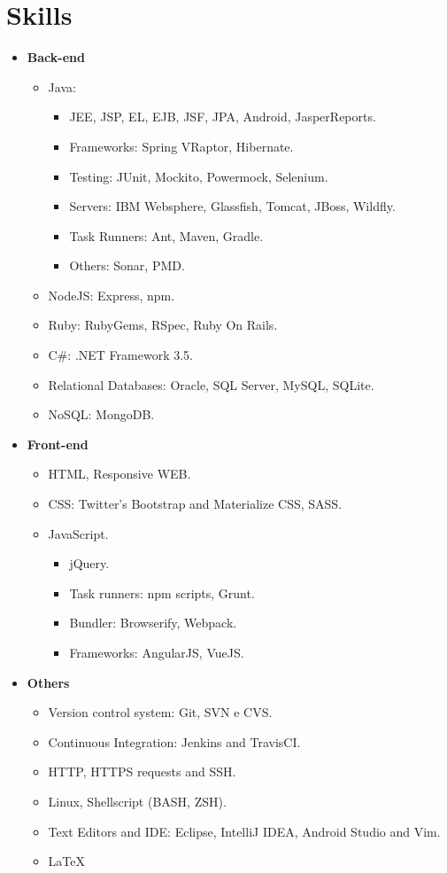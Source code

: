 \documentclass[12pt,a4paper]{moderncv}
\begin{document}
\section{Skills}
\begin{itemize}
\item \textbf{Back-end}
\begin{itemize}
    \item Java:
    \begin{itemize}
        \item JEE, JSP, EL, EJB, JSF, JPA, Android, JasperReports.
        \item Frameworks: Spring VRaptor, Hibernate.
        \item Testing: JUnit, Mockito, Powermock, Selenium.
        \item Servers: IBM Websphere, Glassfish, Tomcat, JBoss, Wildfly.
        \item Task Runners: Ant, Maven, Gradle.
        \item Others: Sonar, PMD.
    \end{itemize}
    \item NodeJS: Express, npm.
    \item Ruby: RubyGems, RSpec, Ruby On Rails.
    \item C\#: .NET Framework 3.5.
    \item Relational Databases: Oracle, SQL Server, MySQL, SQLite.
    \item NoSQL: MongoDB.
\end{itemize}
\item \textbf{Front-end}
\begin{itemize}
    \item HTML, Responsive WEB.
    \item CSS: Twitter's Bootstrap and Materialize CSS, SASS.
    \item JavaScript.
    \begin{itemize}
        \item jQuery.
        \item Task runners: npm scripts, Grunt.
        \item Bundler: Browserify, Webpack.
        \item Frameworks: AngularJS, VueJS.
    \end{itemize}
\end{itemize}
\item \textbf{Others}
\begin{itemize}
  \item Version control system: Git, SVN e CVS.
  \item Continuous Integration: Jenkins and TravisCI.
  \item HTTP, HTTPS requests and SSH.
  \item Linux, Shellscript (BASH, ZSH).
  \item Text Editors and IDE: Eclipse, IntelliJ IDEA, Android Studio and Vim.
  \item \LaTeX\
\end{itemize}
\end{itemize}
\end{document}
